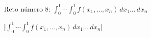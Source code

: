

\bigskip

\enunciadoS Reto n\'umero 8:
$\int_0^1\!\cdots\int_0^1 f(x_1,\dots,x_n)\, dx_1\dots\,dx_n$

\bigskip

\respuestaS

|$\int_0^1\!\cdots\int_0^1 f(x_1,\dots,x_n)\, dx_1\dots\,dx_n$|

\bye

